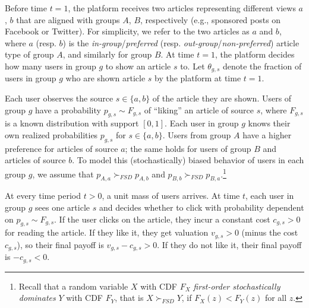 \documentclass[letterpaper]{article} %
\begin{document}
Before time $t=1$, the platform receives two articles representing different views $a$, $b$ that are aligned with groups $A$, $B$, respectively (e.g., sponsored posts on Facebook or Twitter).
For simplicity, we refer to the two articles as $a$ and $b$, where $a$ (resp. $b$) is the \emph{in-group}/\emph{preferred} (resp. \emph{out-group}/\emph{non-preferred}) article type of group $A$, and similarly for group $B$.
At time $t=1$, the platform decides how many users in group $g$ to show an article $s$ to.
Let $\theta_{g,s}$  denote the fraction of users in group $g$ who are shown article $s$ by the platform at time $t=1$.

Each user observes the source $s\in\{a,b\}$ of the article they are shown.
Users of group $g$ have a probability $p_{g,s} \sim F_{g,s}$ of ``liking'' an article of source $s$, where $F_{g,s}$ is a known distribution with support $[0,1]$.
Each user in group $g$ %
knows their own realized probabilities $p_{g,s}$ for $s \in \{a,b\}$.
Users from group $A$ have a higher preference for articles of source $a$; the same holds for users of group $B$ and articles of source $b$.
To model this (stochastically) biased behavior of users in each group $g$, we assume that $p_{A,a} \succ_{FSD} p_{A, b}$ and $p_{B,b} \succ_{FSD} p_{B, a}$.\footnote{Recall that a random variable $X$ with CDF $F_X$ \textit{first-order stochastically dominates} $Y$ with CDF $F_Y$, that is $X \succ_{FSD} Y$, if $F_X(z) < F_Y(z)$ for all $z$.}

At every time period $t >0$, a unit mass of users arrives.
At time $t$, each user in group $g$ sees one article $s$ and decides whether to click with probability dependent on $p_{g,s} \sim F_{g,s}$.
If the user clicks on the article, they incur a constant cost $c_{g,s}>0$ for reading the article.
If they like it, they get valuation $v_{g,s}>0$ (minus the cost $c_{g,s}$), so their final payoff is $v_{g,s}-c_{g,s}>0$.
If they do not like it, their final payoff is $-c_{g,s}<0$.
\end{document}
